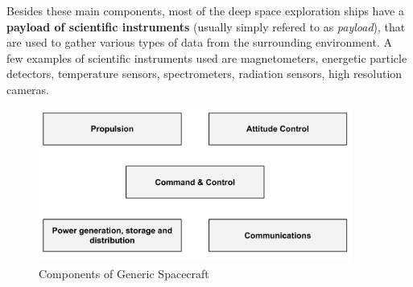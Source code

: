 Besides these main components, most of the deep space exploration ships have a
\textbf{payload of scientific instruments} (usually simply refered to
as \textit{payload}), that are used to gather various types of data from the
surrounding environment. A few examples of scientific instruments used are
magnetometers, energetic particle detectors, temperature sensors,
spectrometers, radiation sensors, high resolution cameras.

\begin{figure}[htb]
	\begin{center}
	\includegraphics[width=0.92\textwidth]{img/generic_structure.pdf}
	\caption{Components of Generic Spacecraft}
	\label{fig:generic_structure}
	\end{center}
\end{figure}
